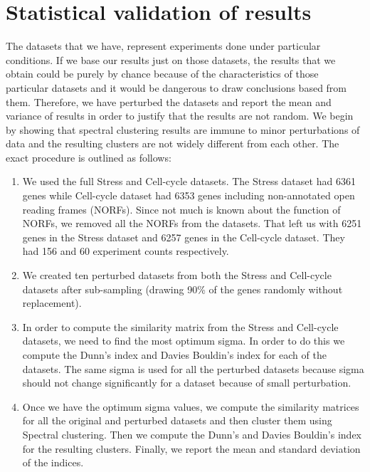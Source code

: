 \section{Statistical validation of results}
The datasets that we have, represent experiments done under particular conditions. If we base our results just on 
those datasets, the results that we obtain could be purely by chance because of the characteristics of those 
particular datasets and it would be dangerous to draw conclusions based from them. 
Therefore, we have perturbed the datasets and report the mean and variance of results in order to justify that 
the results are not random. We begin by showing that spectral clustering results are immune to minor 
perturbations of data and the resulting clusters are not widely different from each other. The exact procedure 
is outlined as follows:

\begin{enumerate}
  
\item We used the full Stress and Cell-cycle datasets. The Stress dataset had 6361 genes while Cell-cycle dataset had 6353 genes including non-annotated open reading frames (NORFs). Since not much is known about the function of NORFs, we removed all the NORFs from the datasets. 
That left us with 6251 genes in the Stress dataset and 6257 genes in the Cell-cycle dataset. They had 156 and 60 experiment counts respectively.
 
\item We created ten perturbed datasets from both the Stress and Cell-cycle datasets after sub-sampling (drawing 90\% of the genes randomly without replacement).

\item In order to compute the similarity matrix from the Stress and Cell-cycle datasets, we need to find the most optimum sigma. 
In order to do this we compute the Dunn's index and Davies Bouldin's index for each of the datasets. The same sigma is used for all the perturbed datasets 
because sigma should not change significantly for a dataset because of small perturbation.

\item Once we have the optimum sigma values, we compute the similarity matrices for all the original and perturbed datasets and then cluster them using Spectral clustering. 
Then we compute the Dunn's and Davies Bouldin's index for the resulting clusters. Finally, we report the mean and standard deviation of the indices. 
\end{enumerate}

